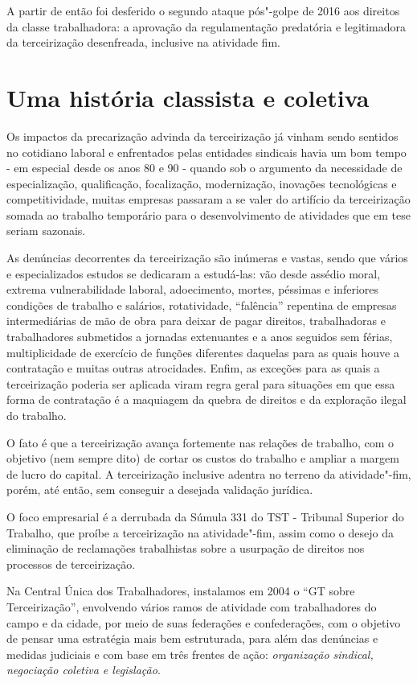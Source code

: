 A partir de então foi desferido o segundo ataque pós"-golpe de 2016 aos
direitos da classe trabalhadora: a aprovação da regulamentação
predatória e legitimadora da terceirização desenfreada, inclusive na
atividade fim.

\section{Uma história classista e coletiva}

Os impactos da precarização advinda da terceirização já vinham sendo
sentidos no cotidiano laboral e enfrentados pelas entidades sindicais
havia um bom tempo - em especial desde os anos 80 e 90 - quando sob o
argumento da necessidade de especialização, qualificação, focalização,
modernização, inovações tecnológicas e competitividade, muitas empresas
passaram a se valer do artifício da terceirização somada ao trabalho
temporário para o desenvolvimento de atividades que em tese seriam
sazonais.

As denúncias decorrentes da terceirização são inúmeras e vastas, sendo
que vários e especializados estudos se dedicaram a estudá-las: vão desde
assédio moral, extrema vulnerabilidade laboral, adoecimento, mortes,
péssimas e inferiores condições de trabalho e salários, rotatividade,
``falência'' repentina de empresas intermediárias de mão de obra para
deixar de pagar direitos, trabalhadoras e trabalhadores submetidos a
jornadas extenuantes e a anos seguidos sem férias, multiplicidade de
exercício de funções diferentes daquelas para as quais houve a
contratação e muitas outras atrocidades. Enfim, as exceções para as
quais a terceirização poderia ser aplicada viram regra geral para
situações em que essa forma de contratação é a maquiagem da quebra de
direitos e da exploração ilegal do trabalho.

O fato é que a terceirização avança fortemente nas relações de trabalho,
com o objetivo (nem sempre dito) de cortar os custos do trabalho e
ampliar a margem de lucro do capital. A terceirização inclusive adentra
no terreno da atividade"-fim, porém, até então, sem conseguir a desejada
validação jurídica.

O foco empresarial é a derrubada da Súmula 331 do TST - Tribunal
Superior do Trabalho, que proíbe a terceirização na atividade"-fim, assim
como o desejo da eliminação de reclamações trabalhistas sobre a
usurpação de direitos nos processos de terceirização.

Na Central Única dos Trabalhadores, instalamos em 2004 o ``GT
sobre Terceirização'', envolvendo vários ramos de atividade com
trabalhadores do campo e da cidade, por meio de suas federações e
confederações, com o objetivo de pensar uma estratégia mais bem
estruturada, para além das denúncias e medidas judiciais e com base em
três frentes de ação: \emph{organização sindical, negociação coletiva e
legislação}.

